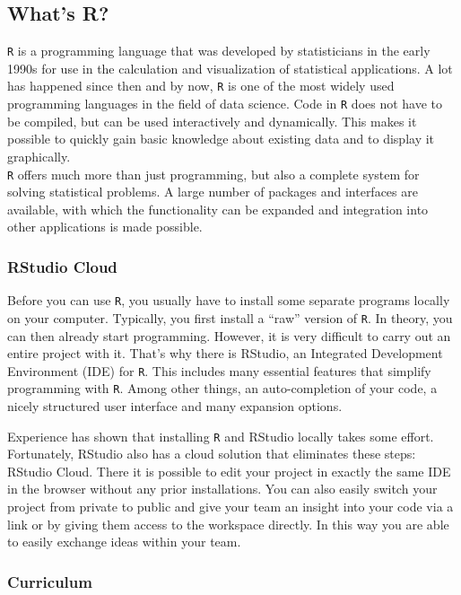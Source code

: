 \documentclass[
  11pt,
]{article}
\begin{document}
\hypertarget{whats-r}{%
\subsection{What's R?}\label{whats-r}}

\texttt{R} is a programming language that was developed by statisticians in the early 1990s for use in the calculation and visualization of statistical applications. A lot has happened since then and by now, \texttt{R} is one of the most widely used programming languages in the field of data science. Code in \texttt{R} does not have to be compiled, but can be used interactively and dynamically. This makes it possible to quickly gain basic knowledge about existing data and to display it graphically.\\
\texttt{R} offers much more than just programming, but also a complete system for solving statistical problems. A large number of packages and interfaces are available, with which the functionality can be expanded and integration into other applications is made possible.

\hypertarget{rstudio-cloud}{%
\subsubsection{RStudio Cloud}\label{rstudio-cloud}}

Before you can use \texttt{R}, you usually have to install some separate programs locally on your computer. Typically, you first install a ``raw'' version of \texttt{R}. In theory, you can then already start programming. However, it is very difficult to carry out an entire project with it. That's why there is RStudio, an Integrated Development Environment (IDE) for \texttt{R}. This includes many essential features that simplify programming with \texttt{R}. Among other things, an auto-completion of your code, a nicely structured user interface and many expansion options.

Experience has shown that installing \texttt{R} and RStudio locally takes some effort. Fortunately, RStudio also has a cloud solution that eliminates these steps: RStudio Cloud. There it is possible to edit your project in exactly the same IDE in the browser without any prior installations. You can also easily switch your project from private to public and give your team an insight into your code via a link or by giving them access to the workspace directly. In this way you are able to easily exchange ideas within your team.

\hypertarget{curriculum}{%
\subsubsection{Curriculum}\label{curriculum}}
\end{document}
